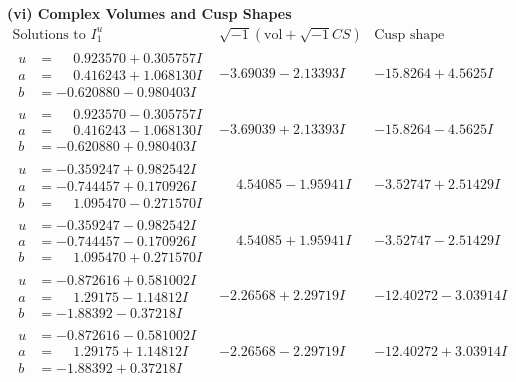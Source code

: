 \documentclass[1p]{elsarticle_modified}
\theoremstyle{definition}
\newcommand{\I}{\sqrt{-1}}
\begin{document}
\newpage\flushleft \textbf{(vi) Complex Volumes and Cusp Shapes}
$$\begin{array}{c|c|c}  
\text{Solutions to }I^u_{1}& \I (\text{vol} + \sqrt{-1}CS) & \text{Cusp shape}\\
 \hline 
\begin{aligned}
u &= \phantom{-}0.923570 + 0.305757 I \\
a &= \phantom{-}0.416243 + 1.068130 I \\
b &= -0.620880 - 0.980403 I\end{aligned}
 & -3.69039 - 2.13393 I & -15.8264 + 4.5625 I \\ \hline\begin{aligned}
u &= \phantom{-}0.923570 - 0.305757 I \\
a &= \phantom{-}0.416243 - 1.068130 I \\
b &= -0.620880 + 0.980403 I\end{aligned}
 & -3.69039 + 2.13393 I & -15.8264 - 4.5625 I \\ \hline\begin{aligned}
u &= -0.359247 + 0.982542 I \\
a &= -0.744457 + 0.170926 I \\
b &= \phantom{-}1.095470 - 0.271570 I\end{aligned}
 & \phantom{-}4.54085 - 1.95941 I & -3.52747 + 2.51429 I \\ \hline\begin{aligned}
u &= -0.359247 - 0.982542 I \\
a &= -0.744457 - 0.170926 I \\
b &= \phantom{-}1.095470 + 0.271570 I\end{aligned}
 & \phantom{-}4.54085 + 1.95941 I & -3.52747 - 2.51429 I \\ \hline\begin{aligned}
u &= -0.872616 + 0.581002 I \\
a &= \phantom{-}1.29175 - 1.14812 I \\
b &= -1.88392 - 0.37218 I\end{aligned}
 & -2.26568 + 2.29719 I & -12.40272 - 3.03914 I \\ \hline\begin{aligned}
u &= -0.872616 - 0.581002 I \\
a &= \phantom{-}1.29175 + 1.14812 I \\
b &= -1.88392 + 0.37218 I\end{aligned}
 & -2.26568 - 2.29719 I & -12.40272 + 3.03914 I \\ \hline\begin{aligned}

\end{aligned}
\end{array}$$
\end{document}
